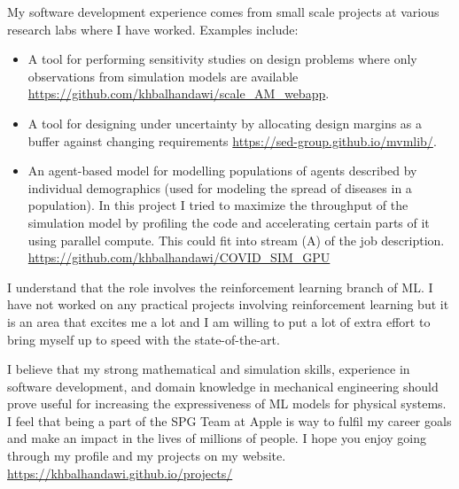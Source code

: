 \documentclass[12pt]{article} %
\begin{document}
\medskip %

My software development experience comes from small scale projects at various research labs where I have worked. Examples include:

\begin{itemize}
	\item A tool for performing sensitivity studies on design problems where only observations from simulation models are available \href{https://github.com/khbalhandawi/scale_AM_webapp}{https://github.com/khbalhandawi/scale\_AM\_webapp}.
	\item A tool for designing under uncertainty by allocating design margins as a buffer against changing requirements \href{https://sed-group.github.io/mvmlib/}{https://sed-group.github.io/mvmlib/}.
	\item An agent-based model for modelling populations of agents described by individual demographics (used for modeling the spread of diseases in a population). In this project I tried to maximize the throughput of the simulation model by profiling the code and accelerating certain parts of it using parallel compute. This could fit into stream (A) of the job description.\\ 
	\href{https://github.com/khbalhandawi/COVID_SIM_GPU}{https://github.com/khbalhandawi/COVID\_SIM\_GPU}
\end{itemize}

\medskip %

I understand that the role involves the reinforcement learning branch of ML. I have not worked on any practical projects involving reinforcement learning but it is an area that excites me a lot and I am willing to put a lot of extra effort to bring myself up to speed with the state-of-the-art.  

\medskip %

I believe that my strong mathematical and simulation skills, experience in software development, and domain knowledge in mechanical engineering should prove useful for increasing the expressiveness of ML models for physical systems. I feel that being a part of the SPG Team at Apple is way to fulfil my career goals and make an impact in the lives of millions of people. I hope you enjoy going through my profile and my projects on my website. \href{https://khbalhandawi.github.io/projects/}{https://khbalhandawi.github.io/projects/}


\medskip %
\end{document}
